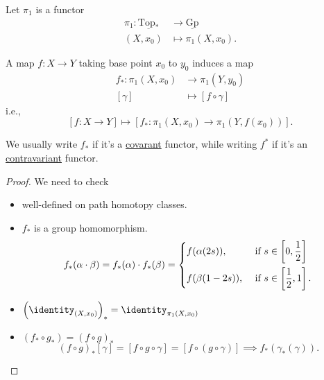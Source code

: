 \begin{theorem}
	Let \(\pi _1\) is a functor
	\[
		\begin{split}
			\pi _1\colon \underline{\mathrm{Top}_*} &\to \underline{\mathrm{Gp}}\\
			(X, x_0)&\mapsto \pi _1(X, x_0).
		\end{split}
	\]

	A map \(f\colon X\to Y\) taking base point \(x_0\) to \(y_0\) induces a map
	\[
		\begin{split}
			f_*\colon \pi _1(X, x_0)&\to \pi _1(Y, y_0)\\
			[\gamma]&\mapsto [f\circ \gamma]
		\end{split}
	\]
	i.e.,
	\[
		\left[f\colon X\to Y\right] \mapsto \left[f_*\colon \pi _1(X, x_0)\to \pi _1(Y, f(x_0))\right].
	\]
\end{theorem}
\begin{notation}
	We usually write \(f_*\) if it's a \hyperref[def:functor]{covarant} functor, while writing \(f^*\)
	if it's an \hyperref[def:contravariant-functor]{contravariant} functor.
\end{notation}
\begin{proof}
	We need to check
	\begin{itemize}
		\item well-defined on path homotopy classes.
		\item \(f_*\) is a group homomorphism.
		      \[
			      f_*(\alpha \cdot \beta ) = f_*(\alpha )\cdot f_*(\beta ) = \begin{dcases}
				      f(\alpha (2s)),  & \text{ if }  s\in \left[0, \frac{1}{2}\right]  \\
				      f(\beta (1-2s)), & \text{ if }  s\in \left[\frac{1}{2}, 1\right].
			      \end{dcases}
		      \]
		\item \(\left(\identity_{(X, x_0)} \right)_* = \identity_{\pi _1(X, x_0)} \)
		\item \((f_*\circ g_*) = (f\circ g)_*\)
		      \[
			      (f\circ g)_*[\gamma] = [f\circ g\circ \gamma] = [f\circ (g\circ \gamma)]\implies f_*(\gamma_*(\gamma)).
		      \]
	\end{itemize}
\end{proof}